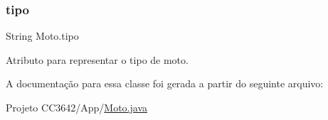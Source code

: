 \subsubsection{\texorpdfstring{tipo}{tipo}}
{\footnotesize\ttfamily String Moto.\+tipo\hspace{0.3cm}{\ttfamily [private]}}



Atributo para representar o tipo de moto. 



A documentação para essa classe foi gerada a partir do seguinte arquivo\+:\begin{DoxyCompactItemize}
\item 
Projeto C\+C3642/\+App/\mbox{\hyperlink{_moto_8java}{Moto.\+java}}\end{DoxyCompactItemize}
